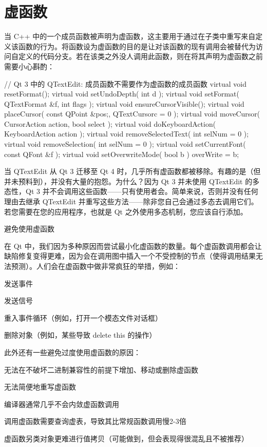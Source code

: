 \section{虚函数}

当 C++ 中的一个成员函数被声明为虚函数，这主要用于通过在子类中重写来自定义该函数的行为。将函数设为虚函数的目的是让对该函数的现有调用会被替代为访问自定义的代码分支。若在该类之外没人调用此函数，则在将其声明为虚函数之前需要小心斟酌：

\begin{cppcode}
// Qt 3 中的 QTextEdit: 成员函数不需要作为虚函数的成员函数
virtual void resetFormat();
virtual void setUndoDepth( int d );
virtual void setFormat( QTextFormat &f, int flags );
virtual void ensureCursorVisible();
virtual void placeCursor( const QPoint &pos;, QTextCursorc = 0 );
virtual void moveCursor( CursorAction action, bool select );
virtual void doKeyboardAction( KeyboardAction action );
virtual void removeSelectedText( int selNum = 0 );
virtual void removeSelection( int selNum = 0 );
virtual void setCurrentFont( const QFont &f );
virtual void setOverwriteMode( bool b ) { overWrite = b; }
\end{cppcode}

当 QTextEdit 从 Qt 3 迁移至 Qt 4 时，几乎所有虚函数都被移除。有趣的是（但并未预料到），并没有大量的抱怨。为什么？因为 Qt 3 并未使用 QTextEdit 的多态性，Qt 3 并不会调用这些函数——只有使用者会。简单来说，否则并没有任何理由去继承 QTextEdit 并重写这些方法——除非您自己会通过多态去调用它们。若您需要在您的应用程序，也就是 Qt 之外使用多态机制，您应该自行添加。

避免使用虚函数

在 Qt 中，我们因为多种原因而尝试最小化虚函数的数量。每个虚函数调用都会让缺陷修复变得更难，因为会在调用图中插入一个不受控制的节点（使得调用结果无法预测）。人们会在虚函数中做非常疯狂的举措，例如：

\begin{compactitem}
\item 发送事件
\item 发送信号
\item 重入事件循环（例如，打开一个模态文件对话框）
\item 删除对象（例如，某些导致 delete this 的操作）
\end{compactitem}

此外还有一些避免过度使用虚函数的原因：

\begin{compactitem}
\item 无法在不破坏二进制兼容性的前提下增加、移动或删除虚函数
\item 无法简便地重写虚函数
\item 编译器通常几乎不会内敛虚函数调用
\item 调用虚函数需要查询虚表，导致其比常规函数调用慢2-3倍
\item 虚函数另类对象更难进行值拷贝（可能做到，但会表现得很混乱且不被推荐）
\end{compactitem}

